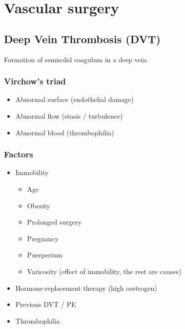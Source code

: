 \documentclass[
  12pt,
]{memoir}
\providecommand{\tightlist}{%
  \setlength{\itemsep}{0pt}\setlength{\parskip}{0pt}}
\begin{document}
\pagebreak

\hypertarget{vascular-surgery}{%
\chapter{Vascular surgery}\label{vascular-surgery}}

\hypertarget{deep-vein-thrombosis-dvt}{%
\section{Deep Vein Thrombosis (DVT)}\label{deep-vein-thrombosis-dvt}}

Formation of semisolid coagulum in a deep vein.

\hypertarget{virchows-triad}{%
\subsection{Virchow's triad}\label{virchows-triad}}

\begin{itemize}
\tightlist
\item
  Abnormal surface (endothelial damage)
\item
  Abnormal flow (stasis / turbulence)
\item
  Abnormal blood (thrombophilia)
\end{itemize}

\hypertarget{factors}{%
\subsection{Factors}\label{factors}}

\begin{itemize}
\tightlist
\item
  Immobility

  \begin{itemize}
  \tightlist
  \item
    Age
  \item
    Obesity
  \item
    Prolonged surgery
  \item
    Pregnancy
  \item
    Puerperium
  \item
    Varicosity (effect of immobility, the rest are causes)
  \end{itemize}
\item
  Hormone-replacement therapy (high oestrogen)
\item
  Previous DVT / PE
\item
  Thrombophilia
\end{itemize}
\end{document}
